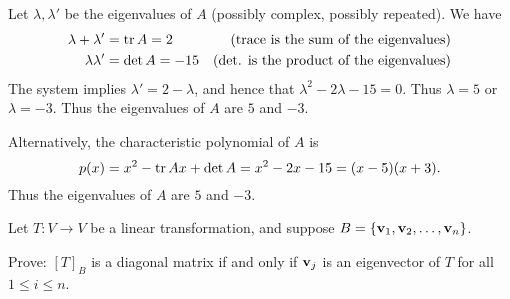 \begin{solution}
Let $\lambda, \lambda'$ be the eigenvalues of $A$ (possibly complex, possibly repeated). We have 
\begin{align*}
\lambda+\lambda'&=\operatorname{tr} A=2 &\text{(trace is the sum of the eigenvalues)}\\
\lambda\lambda'&=\det A=-15&\text{(det. is the product of the eigenvalues)}
\end{align*}
The system implies $\lambda'=2-\lambda$, and hence that $\lambda^2-2\lambda-15=0$. Thus $\lambda=5$ or $\lambda=-3$. Thus the eigenvalues of $A$ are $5$ and $-3$. 

Alternatively, the characteristic polynomial of $A$ is 
\[
p(x)=x^2-\operatorname{tr} A x+\det A=x^2-2x-15=(x-5)(x+3).
\]
Thus the eigenvalues of $A$ are $5$ and $-3$. 

\end{solution} 
\ii Let $T\colon V\rightarrow V$ be a linear transformation, and suppose $B=\{{\mathbf v}_1, {\mathbf v}_2,\dots, {\mathbf v}_n\}$. 

\noindent
Prove: $[T]_B$ is a diagonal matrix if and only if ${\mathbf v}_j$ is an eigenvector of $T$ for all $1\leq i\leq n$. 

